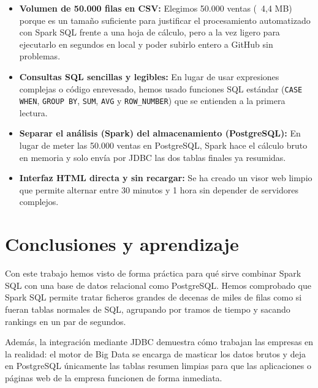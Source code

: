 \documentclass[a4paper,12pt]{article}
\begin{document}
\begin{itemize}[leftmargin=1.0cm]
  \item \textbf{Volumen de 50.000 filas en CSV:} Elegimos 50.000 ventas (~4,4 MB) porque es un tamaño suficiente para justificar el procesamiento automatizado con Spark SQL frente a una hoja de cálculo, pero a la vez ligero para ejecutarlo en segundos en local y poder subirlo entero a GitHub sin problemas.
  \item \textbf{Consultas SQL sencillas y legibles:} En lugar de usar expresiones complejas o código enrevesado, hemos usado funciones SQL estándar (\texttt{CASE WHEN}, \texttt{GROUP BY}, \texttt{SUM}, \texttt{AVG} y \texttt{ROW\_NUMBER}) que se entienden a la primera lectura.
  \item \textbf{Separar el análisis (Spark) del almacenamiento (PostgreSQL):} En lugar de meter las 50.000 ventas en PostgreSQL, Spark hace el cálculo bruto en memoria y solo envía por JDBC las dos tablas finales ya resumidas.
  \item \textbf{Interfaz HTML directa y sin recargar:} Se ha creado un visor web limpio que permite alternar entre 30 minutos y 1 hora sin depender de servidores complejos.
\end{itemize}

\section{Conclusiones y aprendizaje}

Con este trabajo hemos visto de forma práctica para qué sirve combinar Spark SQL con una base de datos relacional como PostgreSQL. Hemos comprobado que Spark SQL permite tratar ficheros grandes de decenas de miles de filas como si fueran tablas normales de SQL, agrupando por tramos de tiempo y sacando rankings en un par de segundos.

Además, la integración mediante JDBC demuestra cómo trabajan las empresas en la realidad: el motor de Big Data se encarga de masticar los datos brutos y deja en PostgreSQL únicamente las tablas resumen limpias para que las aplicaciones o páginas web de la empresa funcionen de forma inmediata.

\end{document}
